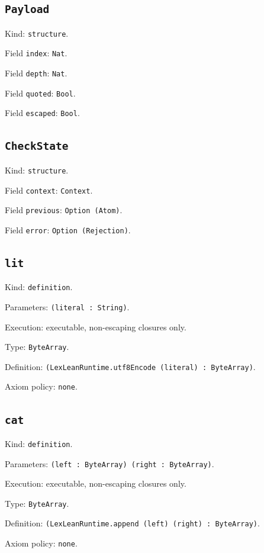 \documentclass[11pt]{article}
\begin{document}
\subsection*{\texttt{Payload}}
\noindent Kind: \texttt{structure}.\par
\noindent Field \texttt{index}: \texttt{Nat}.\par
\noindent Field \texttt{depth}: \texttt{Nat}.\par
\noindent Field \texttt{quoted}: \texttt{Bool}.\par
\noindent Field \texttt{escaped}: \texttt{Bool}.\par
\subsection*{\texttt{CheckState}}
\noindent Kind: \texttt{structure}.\par
\noindent Field \texttt{context}: \texttt{Context}.\par
\noindent Field \texttt{previous}: \texttt{Option (Atom)}.\par
\noindent Field \texttt{error}: \texttt{Option (Rejection)}.\par
\subsection*{\texttt{lit}}
\noindent Kind: \texttt{definition}.\par
\noindent Parameters: \texttt{(literal : String)}.\par
\noindent Execution: executable, non-escaping closures only.\par
\noindent Type: \texttt{ByteArray}.\par
\noindent Definition: \texttt{(LexLeanRuntime.utf8Encode (literal) : ByteArray)}.\par
\noindent Axiom policy: \texttt{none}.\par
\subsection*{\texttt{cat}}
\noindent Kind: \texttt{definition}.\par
\noindent Parameters: \texttt{(left : ByteArray) (right : ByteArray)}.\par
\noindent Execution: executable, non-escaping closures only.\par
\noindent Type: \texttt{ByteArray}.\par
\noindent Definition: \texttt{(LexLeanRuntime.append (left) (right) : ByteArray)}.\par
\noindent Axiom policy: \texttt{none}.\par
\end{document}
